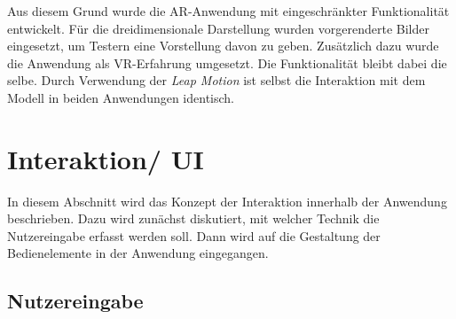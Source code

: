 Aus diesem Grund wurde die AR-Anwendung mit eingeschränkter Funktionalität entwickelt. Für die dreidimensionale Darstellung wurden vorgerenderte Bilder eingesetzt, um Testern eine Vorstellung davon zu geben.
Zusätzlich dazu wurde die Anwendung als VR-Erfahrung umgesetzt. Die Funktionalität bleibt dabei die selbe. 
Durch Verwendung der \textit{Leap Motion} ist selbst die Interaktion mit dem Modell in beiden Anwendungen identisch. 

\section{Interaktion/ UI } 

In diesem Abschnitt wird das Konzept der Interaktion innerhalb der Anwendung beschrieben. Dazu wird zunächst diskutiert, mit welcher Technik die Nutzereingabe erfasst werden soll. Dann wird auf die Gestaltung der Bedienelemente in der Anwendung eingegangen.

\subsection{Nutzereingabe}

